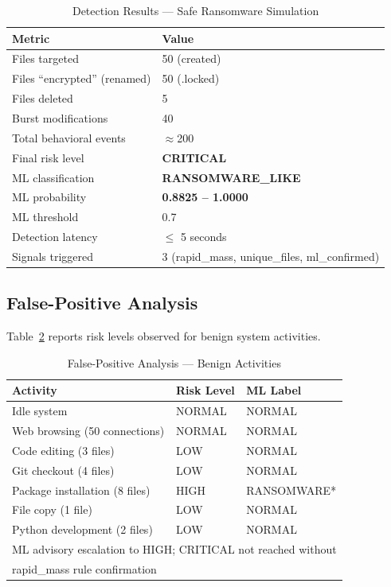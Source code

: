 \documentclass[conference]{IEEEtran}
\begin{document}
\begin{table}[htbp]
\caption{Detection Results — Safe Ransomware Simulation}
\label{tab:detection}
\centering
\begin{tabular}{@{}ll@{}}
\toprule
\textbf{Metric} & \textbf{Value} \\
\midrule
Files targeted & 50 (created) \\
Files ``encrypted'' (renamed) & 50 (.locked) \\
Files deleted & 5 \\
Burst modifications & 40 \\
Total behavioral events & $\approx$200 \\
Final risk level & \textbf{CRITICAL} \\
ML classification & \textbf{RANSOMWARE\_LIKE} \\
ML probability & \textbf{0.8825 -- 1.0000} \\
ML threshold & 0.7 \\
Detection latency & $\leq$ 5 seconds \\
Signals triggered & 3 (rapid\_mass, unique\_files, ml\_confirmed) \\
\bottomrule
\end{tabular}
\end{table}

\subsection{False-Positive Analysis}

Table~\ref{tab:fp} reports risk levels observed for benign
system activities.

\begin{table}[htbp]
\caption{False-Positive Analysis — Benign Activities}
\label{tab:fp}
\centering
\begin{tabular}{@{}lll@{}}
\toprule
\textbf{Activity} & \textbf{Risk Level} & \textbf{ML Label} \\
\midrule
Idle system & NORMAL & NORMAL \\
Web browsing (50 connections) & NORMAL & NORMAL \\
Code editing (3 files) & LOW & NORMAL \\
Git checkout (4 files) & LOW & NORMAL \\
Package installation (8 files) & HIGH & RANSOMWARE* \\
File copy (1 file) & LOW & NORMAL \\
Python development (2 files) & LOW & NORMAL \\
\midrule
\multicolumn{3}{l}{\scriptsize * ML advisory escalation to HIGH;
CRITICAL not reached without} \\
\multicolumn{3}{l}{\scriptsize \quad rapid\_mass rule confirmation} \\
\bottomrule
\end{tabular}
\end{table}
\end{document}
